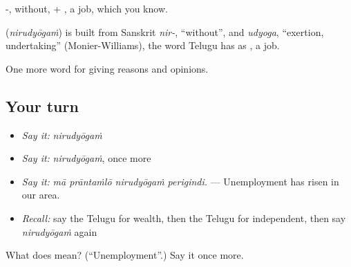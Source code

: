 -, without, + , a job, which you know.

\begin{cousinweb}
\textbf{} (\emph{nirudyōgaṁ}) is built from Sanskrit \emph{nir-}, \textquotedblleft{}without\textquotedblright{}, and \emph{udyoga}, \textquotedblleft{}exertion, undertaking\textquotedblright{} (Monier-Williams), the word Telugu has as , a job.
\end{cousinweb}

\begin{grammarlens}[title={What you've built}]
One more word for giving reasons and opinions.
\end{grammarlens}

\subsection*{Your turn}
\begin{itemize}
\raggedright
  \item \emph{Say it:} \emph{nirudyōgaṁ}
  \item \emph{Say it:} \emph{nirudyōgaṁ}, once more
  \item \emph{Say it:} \emph{mā prāntaṁlō nirudyōgaṁ perigindi.} — Unemployment has risen in our area.
  \item \emph{Recall:} say the Telugu for wealth, then the Telugu for independent, then say \emph{nirudyōgaṁ} again
\end{itemize}

\begin{tcolorbox}[breakable,colback=teal!4,colframe=teal!35!black,title={Before you move on}]
What does  mean? (\textquotedblleft{}Unemployment\textquotedblright{}.) Say it once more.
\end{tcolorbox}
